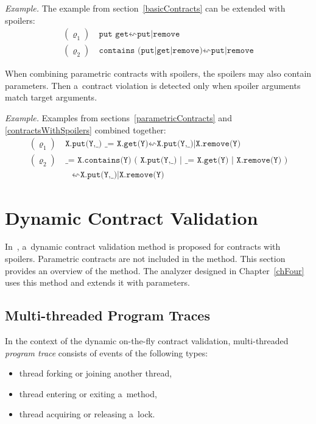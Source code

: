 \medskip \noindent
\emph{Example.} The example from section~\ref{basicContracts} can be extended
with spoilers:
\begin{align*}
    (\varrho_1) &\ \texttt{put get} \leftsquigarrow \texttt{put|remove}\\
    (\varrho_2) &\ \texttt{contains (put|get|remove)} \leftsquigarrow
    \texttt{put|remove}
\end{align*}

When combining parametric contracts with spoilers, the spoilers may also contain
parameters. Then a~contract violation is detected only when spoiler arguments
match target arguments.

\medskip \noindent
\emph{Example.} Examples from sections~\ref{parametricContracts} and
\ref{contractsWithSpoilers} combined together:
\begin{align*}
    (\varrho_1) &\ \texttt{X.put(Y,\_) \_ = X.get(Y)} \leftsquigarrow
    \texttt{X.put(Y,\_)|X.remove(Y)}\\
    (\varrho_2) &\ \texttt{\_ = X.contains(Y) ( X.put(Y,\_) | \_ = X.get(Y) |
    X.remove(Y) )}\\
    &\quad \leftsquigarrow \texttt{X.put(Y,\_)|X.remove(Y)}
\end{align*}


\section{Dynamic Contract Validation}

In~\cite{contracts}, a~dynamic contract validation method is proposed for
contracts with spoilers. Parametric contracts are not included in the method.
This section provides an overview of the method. The analyzer designed in
Chapter~\ref{chFour} uses this method and extends it with parameters.

\subsection{Multi-threaded Program Traces}

In the context of the dynamic on-the-fly contract validation, multi-threaded
\emph{program trace} consists of events of the following types:
\begin{itemize}
    \item thread forking or joining another thread,
    \item thread entering or exiting a~method,
    \item thread acquiring or releasing a~lock.
\end{itemize}


